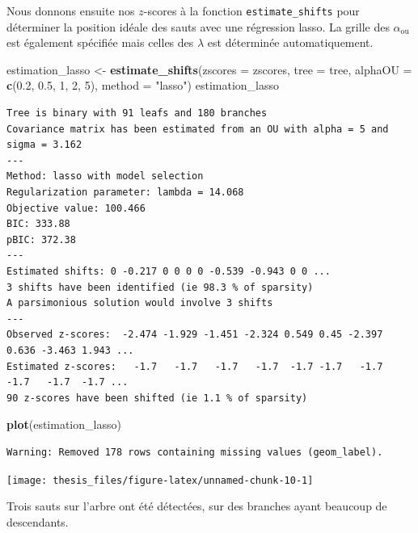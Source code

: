 \documentclass[12pt,a4paper]{reedthesis}
\newenvironment{Shaded}{\begin{snugshade}}{\end{snugshade}}
\newcommand{\DataTypeTok}[1]{\textcolor[rgb]{0.13,0.29,0.53}{#1}}
\newcommand{\DecValTok}[1]{\textcolor[rgb]{0.00,0.00,0.81}{#1}}
\newcommand{\FloatTok}[1]{\textcolor[rgb]{0.00,0.00,0.81}{#1}}
\newcommand{\KeywordTok}[1]{\textcolor[rgb]{0.13,0.29,0.53}{\textbf{#1}}}
\newcommand{\NormalTok}[1]{#1}
\newcommand{\StringTok}[1]{\textcolor[rgb]{0.31,0.60,0.02}{#1}}
\newcommand \ou [1]{{#1}_{\text{ou}}}
\theoremstyle{definition}
\theoremstyle{definition}
\theoremstyle{definition}
\theoremstyle{remark}
\begin{document}
Nous donnons ensuite nos \(z\)-scores à la fonction \texttt{estimate\_shifts} pour déterminer la position idéale des sauts avec une régression lasso. La grille des \(\ou{\alpha}\) est également spécifiée mais celles des \(\lambda\) est déterminée automatiquement.
\begin{Shaded}
\begin{Highlighting}[]
\NormalTok{estimation_lasso <-}\StringTok{ }\KeywordTok{estimate_shifts}\NormalTok{(}\DataTypeTok{zscores =}\NormalTok{ zscores, }\DataTypeTok{tree =}\NormalTok{ tree, }
                                    \DataTypeTok{alphaOU =} \KeywordTok{c}\NormalTok{(}\FloatTok{0.2}\NormalTok{, }\FloatTok{0.5}\NormalTok{, }\DecValTok{1}\NormalTok{, }\DecValTok{2}\NormalTok{, }\DecValTok{5}\NormalTok{),}
                                    \DataTypeTok{method =} \StringTok{"lasso"}\NormalTok{)}
\NormalTok{estimation_lasso}
\end{Highlighting}
\end{Shaded}
\begin{verbatim}
Tree is binary with 91 leafs and 180 branches
Covariance matrix has been estimated from an OU with alpha = 5 and sigma = 3.162 
---
Method: lasso with model selection
Regularization parameter: lambda = 14.068 
Objective value: 100.466
BIC: 333.88
pBIC: 372.38
---
Estimated shifts: 0 -0.217 0 0 0 0 -0.539 -0.943 0 0 ...
3 shifts have been identified (ie 98.3 % of sparsity)
A parsimonious solution would involve 3 shifts
---
Observed z-scores:  -2.474 -1.929 -1.451 -2.324 0.549 0.45 -2.397 0.636 -3.463 1.943 ...
Estimated z-scores:   -1.7   -1.7   -1.7   -1.7  -1.7 -1.7   -1.7  -1.7   -1.7  -1.7 ...
90 z-scores have been shifted (ie 1.1 % of sparsity)
\end{verbatim}
\begin{Shaded}
\begin{Highlighting}[]
\KeywordTok{plot}\NormalTok{(estimation_lasso)}
\end{Highlighting}
\end{Shaded}
\begin{verbatim}
Warning: Removed 178 rows containing missing values (geom_label).
\end{verbatim}
\begin{center}\texttt{[image: thesis\_files/figure-latex/unnamed-chunk-10-1]} \end{center}

Trois sauts sur l'arbre ont été détectées, sur des branches ayant beaucoup de descendants.
\end{document}
